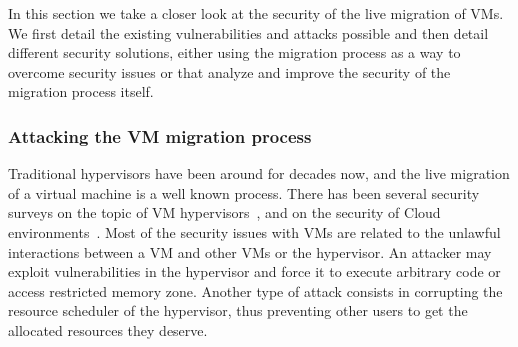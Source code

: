 In this section we take a closer look at the security of the live migration of VMs.
We first detail the existing vulnerabilities and attacks possible and then detail different security solutions, either using the migration process as a way to overcome security issues or that analyze and improve the security of the migration process itself.

\subsubsection{Attacking the VM migration process}
Traditional hypervisors have been around for decades now, and the live migration of a virtual machine is a well known process. There has been several security surveys on the topic of VM hypervisors~\cite{Reuben2007,Rehman2013,Sahoo2010,Perez-Botero2013}, and on the security of Cloud environments~\cite{cloudenvironmentsecuritysurvey-fernandes2014}.
Most of the security issues with VMs are related to the unlawful interactions between a VM and other VMs or the hypervisor.
An attacker may exploit vulnerabilities in the hypervisor and force it to execute arbitrary code or access restricted memory zone.
Another type of attack consists in corrupting the resource scheduler of the hypervisor, thus preventing other users to get the allocated resources they deserve.

